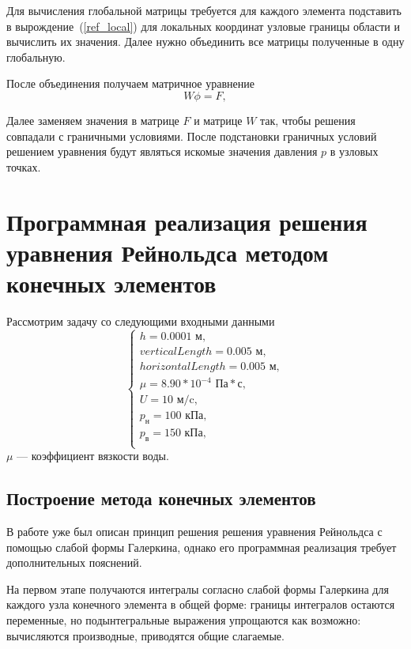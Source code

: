 \documentclass[12pt, a4paper]{article}
\begin{document}
Для вычисления глобальной матрицы требуется для каждого элемента подставить в вырождение~(\ref{ref_local}) для локальных координат узловые границы области и вычислить их значения. 
Далее нужно объединить все матрицы полученные в одну глобальную.

После объединения получаем матричное уравнение 
\begin{equation*}
	W \phi = F,
\end{equation*}

Далее заменяем значения в матрице $F$ и матрице $W$ так, чтобы решения совпадали с граничными условиями.
После подстановки граничных условий решением уравнения будут являться искомые значения давления $p$ в узловых точках.

\section{Программная реализация решения уравнения Рейнольдса методом конечных элементов}

Рассмотрим задачу со следующими входными данными 
\begin{equation*}
	\begin{cases}
		h = 0.0001 \text{ м}, \\
		verticalLength = 0.005 \text{ м}, \\
		horizontalLength = 0.005 \text{ м}, \\
		\mu = 8.90 * 10^{-4} \text{ Па}*\text{с}, \\
		U = 10 \text{ м/c}, \\
		p_{\text{н}} = 100 \text{ кПа}, \\
		p_{\text{в}} = 150 \text{ кПа}, \\
	\end{cases}	
\end{equation*}
$\mu$ --- коэффициент вязкости воды.

\subsection{Построение метода конечных элементов}
В работе уже был описан принцип решения решения уравнения Рейнольдса с помощью слабой формы Галеркина, однако его программная реализация требует дополнительных пояснений.

На первом этапе получаются интегралы согласно слабой формы Галеркина для каждого узла конечного элемента в общей форме: границы интегралов остаются переменные, но подынтегральные выражения упрощаются как возможно: вычисляются производные, приводятся общие слагаемые.
\end{document}
